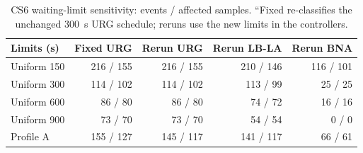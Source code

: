 \begin{table}[tbp]
\caption{CS6 waiting-limit sensitivity: events / affected samples. ``Fixed re-classifies the unchanged 300~s URG schedule; reruns use the new limits in the controllers.\label{tab:thresholds}}
\centering
\footnotesize
\begin{tabular}{lrrrr}
\toprule
Limits (s) & Fixed URG & Rerun URG & Rerun LB-LA & Rerun BNA\\
\midrule
Uniform 150 & 216 / 155 & 216 / 155 & 210 / 146 & 116 / 101\\
Uniform 300 & 114 / 102 & 114 / 102 & 113 / 99 & 25 / 25\\
Uniform 600 & 86 / 80 & 86 / 80 & 74 / 72 & 16 / 16\\
Uniform 900 & 73 / 70 & 73 / 70 & 54 / 54 & 0 / 0\\
Profile A & 155 / 127 & 145 / 117 & 141 / 117 & 66 / 61\\
\bottomrule
\end{tabular}
\end{table}
